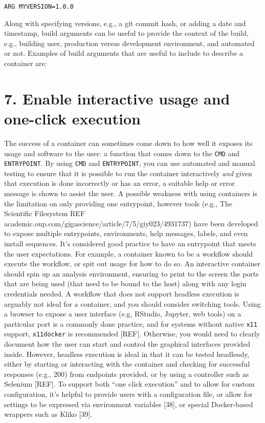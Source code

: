 \documentclass[10pt,letterpaper]{article}
\begin{document}
\begin{verbatim}
ARG MYVERSION=1.0.0
\end{verbatim}

Along with specifying versions, e.g., a git commit hash, or adding a
date and timestamp, build arguments can be useful to provide the context
of the build, e.g., building user, production versus development
environment, and automated or not. Examples of build arguments that are
useful to include to describe a container are:

\hypertarget{enable-interactive-usage-and-one-click-execution}{%
\section*{7. Enable interactive usage and one-click
execution}\label{enable-interactive-usage-and-one-click-execution}}

The success of a container can sometimes come down to how well it
exposes its usage and software to the user: a function that comes down
to the \texttt{CMD} and \texttt{ENTRYPOINT}. By using \texttt{CMD} and
\texttt{ENTRYPOINT}, you can use automated and manual testing to ensure
that it is possible to run the container interactively \emph{and} given
that execution is done incorrectly or has an error, a suitable help or
error message is shown to assist the user. A possible weakness with
using containers is the limitation on only providing one entrypoint,
however tools (e.g., The Scientific Filesystem REF
academic.oup.com/gigascience/article/7/5/giy023/4931737) have been
developed to expose multiple entrypoints, environments, help messages,
labels, and even install sequences. It's considered good practice to
have an entrypoint that meets the user expectations. For example, a
container known to be a workflow should execute the workflow, or spit
out usage for how to do so. An interactive container should spin up an
analysis environment, ensuring to print to the screen the ports that are
being used (that need to be bound to the host) along with any login
credentials needed. A workflow that does not support headless execution
is arguably not ideal for a container, and you should consider switching
tools. Using a browser to expose a user interface (e.g, RStudio,
Jupyter, web tools) on a particular port is a commonly done practice,
and for systems without native \texttt{x11} support, \texttt{x11docker}
is recommended {[}REF{]}. Otherwise, you would need to clearly document
how the user can start and control the graphical interfaces provided
inside. However, headless execution is ideal in that it can be tested
headlessly, either by starting or interacting with the container and
checking for successful responses (e.g., 200) from endpoints provided,
or by using a controller such as Selenium {[}REF{]}. To support both
``one click execution'' and to allow for custom configuration, it's
helpful to provide users with a configuration file, or allow for
settings to be expressed via environment variables {[}38{]}, or special
Docker-based wrappers such as Kliko {[}39{]}.
\end{document}
